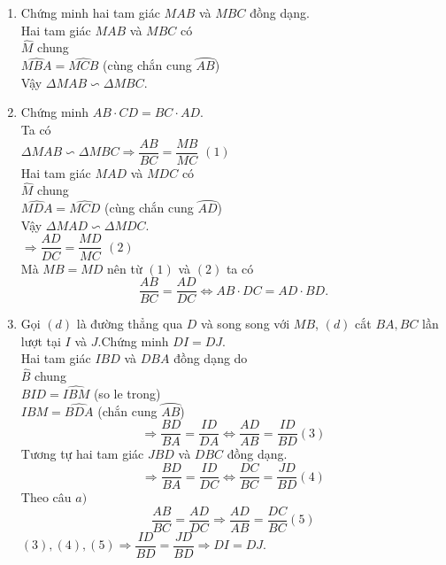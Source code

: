 \begin{ex}
{\begin{enumerate}
\item Chứng minh hai tam giác $MAB$ và $MBC$ đồng dạng.\\
Hai tam giác $MAB$ và $MBC$ có\\
$\widehat{M}$ chung\\
$\widehat{MBA} = \widehat{MCB}$ (cùng chắn cung $\wideparen{AB}$)\\
Vậy $\Delta MAB \backsim \Delta MBC.$
\item Chứng minh $AB \cdot CD = BC  \cdot AD.$\\
Ta có \\
$\Delta MAB \backsim \Delta MBC \Rightarrow \dfrac{AB}{BC} = \dfrac{MB}{MC}$ $(1)$\\
Hai tam giác $MAD$ và $MDC$ có\\
$\widehat{M}$ chung\\
$\widehat{MDA} = \widehat{MCD}$ (cùng chắn cung $\wideparen{AD}$)\\
Vậy $\Delta MAD \backsim  \Delta MDC.$\\
$\Rightarrow \dfrac{AD}{DC} = \dfrac{MD}{MC}$ $(2)$\\
Mà $MB = MD$ nên từ $(1)$ và $(2)$ ta có\\
$$\dfrac{AB}{BC} = \dfrac{AD}{DC} \Leftrightarrow AB \cdot DC = AD \cdot BD.$$
\item Gọi $(d)$ là đường thẳng qua $D$ và song song với $MB$, $(d)$ cắt $BA,BC$ lần lượt tại $I$ và $J$.Chứng minh $DI=DJ.$\\
Hai tam giác $IBD$ và $DBA$ đồng dạng do\\
$\widehat{B}$ chung\\
$\widehat{BID} = \widehat{IBM}$ (so le trong)\\
$\widehat{IBM} = \widehat{BDA}$ (chắn cung  $\wideparen{AB}$)
$$\Rightarrow \dfrac{BD}{BA} =  \dfrac{ID}{DA} \Leftrightarrow \dfrac{AD}{AB} = \dfrac{ID}{BD} (3)$$
Tương tự hai tam giác $JBD$ và $DBC$ đồng dạng.
$$\Rightarrow \dfrac{BD}{BA} = \dfrac{ID}{DC} \Leftrightarrow \dfrac{DC}{BC} = \dfrac{JD}{BD} (4)$$
Theo câu $a)$
$$\dfrac{AB}{BC} = \dfrac{AD}{DC} \Rightarrow \dfrac{AD}{AB} = \dfrac{DC}{BC} (5)$$
$(3),(4),(5) \Rightarrow \dfrac{ID}{BD} = \dfrac{JD}{BD} \Rightarrow DI = DJ.$
\end{enumerate}
}
\end{ex}
